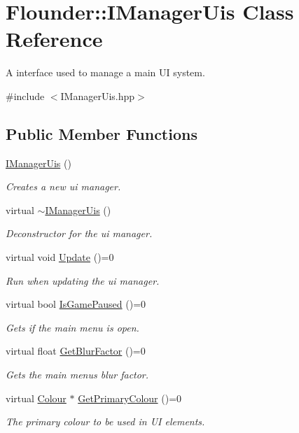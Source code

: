 \hypertarget{class_flounder_1_1_i_manager_uis}{}\section{Flounder\+:\+:I\+Manager\+Uis Class Reference}
\label{class_flounder_1_1_i_manager_uis}


A interface used to manage a main UI system.  




{\ttfamily \#include $<$I\+Manager\+Uis.\+hpp$>$}

\subsection*{Public Member Functions}
\begin{DoxyCompactItemize}
\item 
\hyperlink{class_flounder_1_1_i_manager_uis_afc671f111a218462336ba9d0c1990b05}{I\+Manager\+Uis} ()
\begin{DoxyCompactList}\small\item\em Creates a new ui manager. \end{DoxyCompactList}\item 
virtual \hyperlink{class_flounder_1_1_i_manager_uis_aab47b73e7bb78916bea28d49e9d55b57}{$\sim$\+I\+Manager\+Uis} ()
\begin{DoxyCompactList}\small\item\em Deconstructor for the ui manager. \end{DoxyCompactList}\item 
virtual void \hyperlink{class_flounder_1_1_i_manager_uis_a96b05bd809a74fb4ad2203e683d5f53e}{Update} ()=0
\begin{DoxyCompactList}\small\item\em Run when updating the ui manager. \end{DoxyCompactList}\item 
virtual bool \hyperlink{class_flounder_1_1_i_manager_uis_a010e82af8ea04509c55de7b797c9e4ed}{Is\+Game\+Paused} ()=0
\begin{DoxyCompactList}\small\item\em Gets if the main menu is open. \end{DoxyCompactList}\item 
virtual float \hyperlink{class_flounder_1_1_i_manager_uis_a870d31e72e526f60da335b7db199439e}{Get\+Blur\+Factor} ()=0
\begin{DoxyCompactList}\small\item\em Gets the main menu\textquotesingle{}s blur factor. \end{DoxyCompactList}\item 
virtual \hyperlink{class_flounder_1_1_colour}{Colour} $\ast$ \hyperlink{class_flounder_1_1_i_manager_uis_ad9337b92e6eb3910e111b89f3c3bb2e1}{Get\+Primary\+Colour} ()=0
\begin{DoxyCompactList}\small\item\em The primary colour to be used in UI elements. \end{DoxyCompactList}\end{DoxyCompactItemize}


